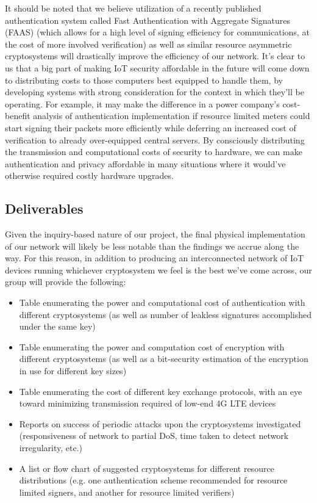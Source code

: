 \documentclass[a4paper,titlepage]{article}
\begin{document}
It should be noted that we believe utilization of a recently published authentication system called Fast Authentication with Aggregate Signatures (FAAS) \cite{Numbah1} (which allows for a high level of signing efficiency for communications, at the cost of more involved verification) as well as similar resource asymmetric cryptosystems will drastically improve the efficiency of our network. It's clear to us that a big part of making IoT security affordable in the future will come down to distributing costs to those computers best equipped to handle them, by developing systems with strong consideration for the context in which they'll be operating. For example, it may make the difference in a power company's cost-benefit analysis of authentication implementation if resource limited meters could start signing their packets more efficiently while deferring an increased cost of verification to already over-equipped central servers. By consciously distributing the transmission and computational costs of security to hardware, we can make authentication and privacy affordable in many situations where it would've otherwise required costly hardware upgrades.

\subsection{Deliverables}

Given the inquiry-based nature of our project, the final physical implementation of our network will likely be less notable than the findings we accrue along the way. For this reason, in addition to producing an interconnected network of IoT devices running whichever cryptosystem we feel is the best we've come across, our group will provide the following:
\begin{itemize}
    \item Table enumerating the power and computational cost of authentication with different cryptosystems (as well as number of leakless signatures accomplished under the same key)
    \item Table enumerating the power and computation cost of encryption with different cryptosystems (as well as a bit-security estimation of the encryption in use for different key sizes)
    \item Table enumerating the cost of different key exchange protocols, with an eye toward minimizing transmission required of low-end 4G LTE devices
    \item Reports on success of periodic attacks upon the cryptosystems investigated (responsiveness of network to partial DoS, time taken to detect network irregularity, etc.)
    \item A list or flow chart of suggested cryptosystems for different resource distributions (e.g. one authentication scheme recommended for resource limited signers, and another for resource limited verifiers)
\end{itemize}



\end{document}
